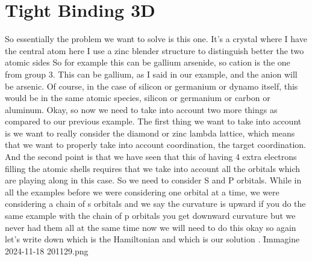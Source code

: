 \section{Tight Binding 3D}
So essentially the problem we want to solve is this one. It's a crystal where I have the central atom here I use a zinc blender structure to distinguish better the two atomic sides So for example this can be gallium arsenide, so cation is the one from group 3. This can be gallium, as I said in our example, and the anion will be arsenic. Of course, in the case of silicon or germanium or dynamo itself, this would be in the same atomic species, silicon or germanium or carbon or aluminum. Okay, so now we need to take into account two more things as compared to our previous example. The first thing we want to take into account is we want to really consider the diamond or zinc lambda lattice, which means that we want to properly take into account coordination, the target coordination. And the second point is that we have seen that this of having 4 extra electrons filling the atomic shells requires that we take into account all the orbitals which are playing along in this case. So we need to consider S and P orbitals. While in all the examples before we were considering one orbital at a time, we were considering a chain of s orbitals and we say the curvature is upward if you do the same example with the chain of p orbitals you get downward curvature but we never had them all at the same time now we will need to do this okay so again let's write down which is the Hamiltonian and which is our solution .
\f{Immagine 2024-11-18 201129.png}
